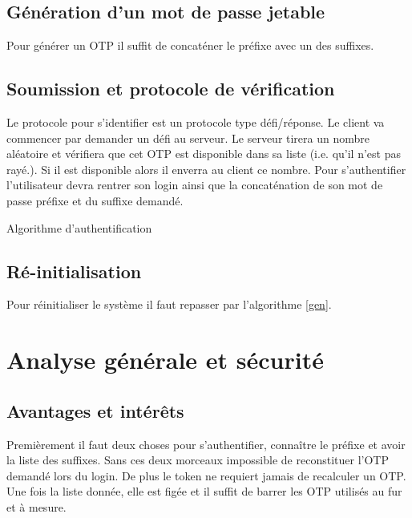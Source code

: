 \documentclass{../res/univ-projet}
\begin{document}
\subsection{Génération d'un mot de passe jetable}
    Pour générer un OTP il suffit de concaténer le préfixe avec un des suffixes.

\subsection{Soumission et protocole de vérification}
        Le protocole pour s'identifier est un protocole type défi/réponse. Le client
    va commencer par demander un défi au serveur. Le serveur tirera un nombre aléatoire
    et vérifiera que cet OTP est disponible dans sa liste (i.e. qu'il n'est pas rayé.).
    Si il est disponible alors il enverra au client ce nombre. Pour s'authentifier l'utilisateur
    devra rentrer son login ainsi que la concaténation de son mot de passe préfixe et du suffixe
    demandé.

    \begin{algorithm}
        \begin{algorithmic}
            \ELSE
            \ENDIF
        \end{algorithmic}
        \caption{Algorithme d'authentification}
    \end{algorithm}


\subsection{Ré-initialisation}
        Pour réinitialiser le système il faut repasser par l'algorithme \ref{gen}.

\section{Analyse générale et sécurité}
\subsection{Avantages et intérêts}
        Premièrement il faut deux choses pour s'authentifier, connaître le préfixe et avoir
    la liste des suffixes. Sans ces deux morceaux impossible de reconstituer l'OTP
    demandé lors du login. De plus le \og token\fg{} ne requiert jamais de recalculer un
    OTP. Une fois la liste donnée, elle est figée et il suffit de barrer les OTP utilisés au
    fur et à mesure.
\end{document}
